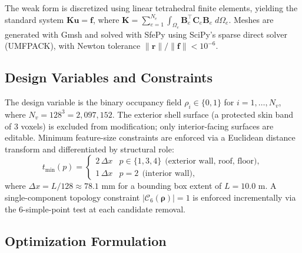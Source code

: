 \documentclass[11pt]{article}
\theoremstyle{plain}
\theoremstyle{definition}
\theoremstyle{remark}
\begin{document}
The weak form is discretized using linear tetrahedral finite elements, yielding the standard system $\mathbf{K}\mathbf{u} = \mathbf{f}$, where $\mathbf{K} = \sum_{e=1}^{N_e} \int_{\Omega_e} \mathbf{B}_e^\top \mathbf{C}_e \mathbf{B}_e\;d\Omega_e$. Meshes are generated with Gmsh \cite{geuzaine2009} and solved with SfePy using SciPy's sparse direct solver (UMFPACK), with Newton tolerance $\|\mathbf{r}\|/\|\mathbf{f}\| < 10^{-6}$.

\subsection{Design Variables and Constraints}
\label{sec:designvar}

The design variable is the binary occupancy field $\rho_i \in \{0,1\}$ for $i = 1, \ldots, N_v$, where $N_v = 128^3 = 2{,}097{,}152$. The exterior shell surface (a protected skin band of 3 voxels) is excluded from modification; only interior-facing surfaces are editable. Minimum feature-size constraints are enforced via a Euclidean distance transform and differentiated by structural role:
\begin{equation}\label{eq:thickness}
t_{\min}(p) =
\begin{cases}
2\,\Delta x & p \in \{1, 3, 4\}~~\text{(exterior wall, roof, floor)}, \\
1\,\Delta x & p = 2~~\text{(interior wall)},
\end{cases}
\end{equation}
where $\Delta x = L/128 \approx 78.1$ mm for a bounding box extent of $L = 10.0$ m. A single-component topology constraint $|\mathcal{C}_6(\boldsymbol{\rho})| = 1$ is enforced incrementally via the 6-simple-point test at each candidate removal.

\subsection{Optimization Formulation}
\label{sec:optform}
\end{document}
